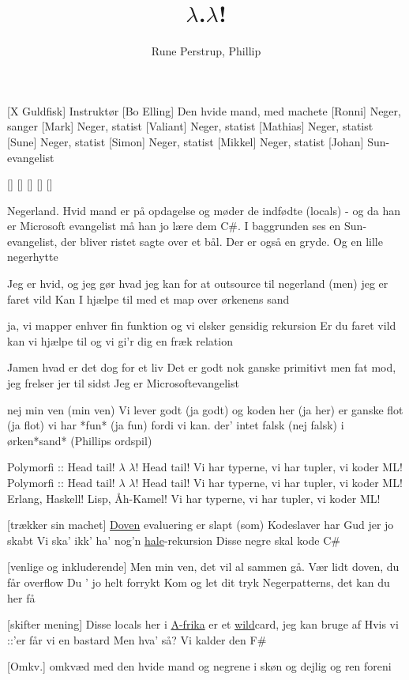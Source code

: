 \documentclass[a4paper,11pt]{article}
\title{$\lambda$.$\lambda$!}
\author{Rune Perstrup, Phillip}
\begin{document}
 \maketitle

 \begin{roles}
   [X Guldfisk] Instruktør
   [Bo Elling] Den hvide mand, med machete
   [Ronni] Neger, sanger
   [Mark] Neger, statist
   [Valiant] Neger, statist
   [Mathias] Neger, statist 
   [Sune] Neger, statist 
   [Simon] Neger, statist 
   [Mikkel] Neger, statist 
   [Johan] Sun-evangelist
 \end{roles}

\begin{props}
   []
   []
   []
   []
   []
\end{props}

\scene Negerland. Hvid mand er på opdagelse og møder de indfødte
(locals) - og da han er Microsoft evangelist må han jo lære dem C\#. I
baggrunden ses en Sun-evangelist, der bliver ristet sagte over et bål.
Der er også en gryde. Og en lille negerhytte

 \begin{song}


Jeg er hvid, og jeg gør hvad jeg kan
for at outsource til negerland
(men) jeg er faret vild
Kan I hjælpe til
med et map over ørkenens sand

ja, vi mapper enhver fin funktion
og vi elsker gensidig rekursion
Er du faret vild
kan vi hjælpe til
og vi gi'r dig en fræk relation

Jamen hvad er det dog for et liv
Det er godt nok ganske primitivt
men fat mod, jeg frelser jer til sidst
Jeg er Microsoftevangelist

nej min ven (min ven) Vi lever godt (ja godt)
og koden her (ja her) er ganske flot (ja flot)
vi har *fun* (ja fun) fordi vi kan.
der' intet falsk (nej falsk) i ørken*sand* (Phillips ordspil)

Polymorfi :: Head tail!
$\lambda$ $\lambda$! Head tail!
Vi har typerne, vi har tupler,
vi koder ML!
Polymorfi :: Head tail!
$\lambda$ $\lambda$! Head tail!
Vi har typerne, vi har tupler,
vi koder ML!
Erlang, Haskell!
Lisp, Åh-Kamel!
Vi har typerne, vi har tupler,
vi koder ML!

[trækker sin machet]
\underline{Doven} evaluering er slapt
(som) Kodeslaver har Gud jer jo skabt
Vi ska' ikk' ha' nog'n
\underline{hale}-rekursion 
Disse negre skal kode C\#

[venlige og inkluderende]
Men min ven, det vil al sammen gå.
Vær lidt doven, du får overflow
Du ' jo helt forrykt
Kom og let dit tryk
Negerpatterns, det kan du her få

[skifter mening]
Disse locals her i \underline{A-frika}
er et \underline{wild}card, jeg kan bruge af
Hvis vi ::'er får vi en bastard
Men hva' så? Vi kalder den F\#

[Omkv.]
\scene omkvæd med den hvide mand og negrene i skøn og dejlig og ren foreni


 \end{song}
\end{document}
